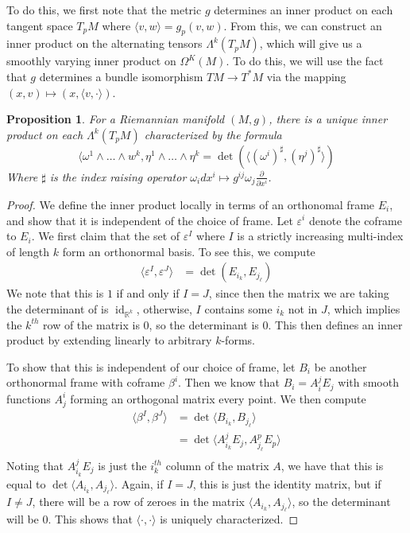\documentclass[psamsfonts]{amsart}
\newtheorem{prop}[thm]{Proposition}
\theoremstyle{definition}
\theoremstyle{remark}
\newcommand{\R}{\mathbb{R}}
\DeclareMathOperator{\id}{id}
\begin{document}
To do this, we first note that the metric $g$ determines an inner product on each tangent space $T_pM$ where $\langle v, w \rangle = g_p(v,w)$. From this, we can construct an inner product on the alternating tensors $\Lambda^k(T_pM)$, which will give us a smoothly varying inner product on $\Omega^K(M)$. To  do this, we will use the fact that $g$ determines a bundle isomorphism $TM \to  T^*M$ via the mapping $(x,v) \mapsto (x, \langle v, \cdot \rangle )$.
%
\begin{prop}
For a Riemannian manifold $(M,g)$,  there is a unique inner product on each $\Lambda^k(T_pM)$ characterized by the formula
$$\langle \omega^1 \wedge \ldots \wedge w^k, \eta^1 \wedge \ldots \wedge \eta^k = \det\left( \big\langle (\omega^i)^\sharp, (\eta^j)^\sharp \big\rangle \right)$$
Where $\sharp$ is the index raising operator $\omega_i dx^i \mapsto g^{ij}\omega_j\frac{\partial}{\partial x^i}$.
\end{prop}
%
\begin{proof}
We define the inner product locally in terms of an orthonomal frame $E_i$, and show that it is independent of the choice of frame. Let $\varepsilon^i$  denote the coframe to  $E_i$. We first claim that the set of $\varepsilon^I$ where $I$  is a strictly increasing multi-index of length $k$ form an orthonormal basis. To see this, we compute 
\begin{align*}
\langle \varepsilon^I, \varepsilon^J \rangle &= \det\left( E_{i_k}, E_{j_\ell} \right) 
\end{align*}
We note that this is $1$ if and only if $I = J$, since then the matrix we are taking the determinant of is $\id_{\R^k}$, otherwise, $I$  contains some $i_k$ not in  $J$, which implies the $k^{th}$ row of the matrix is $0$, so the determinant is $0$. This then defines an inner product by extending linearly to arbitrary $k$-forms.

To show that this is independent of our choice of frame, let  $B_i$ be another orthonormal frame with coframe $\beta^i$. Then we know that $B_i = A^j_iE_j$ with smooth functions $A^i_j$ forming an orthogonal matrix every point. We then compute
\begin{align*}
\langle \beta^I, \beta^J \rangle &= \det \langle B_{i_k}, B_{j_\ell} \rangle \\
&= \det\langle A^j_{i_k}E_j, A^p_{j_\ell}E_p \rangle \\
\end{align*}
Noting that $A^j_{i_k}E_j$ is just the $i_k^{th}$ column of the matrix $A$, we have that this is equal to $\det \langle A_{i_k}, A_{j_\ell} \rangle$. Again, if $I = J$, this is just the identity matrix, but if $I \neq J$, there will be a row of zeroes in the matrix $\langle A_{i_k}, A_{j_\ell}\rangle$, so the determinant will be $0$. This shows that $\langle \cdot, \cdot \rangle$  is uniquely characterized. 
\end{proof}
\end{document}
